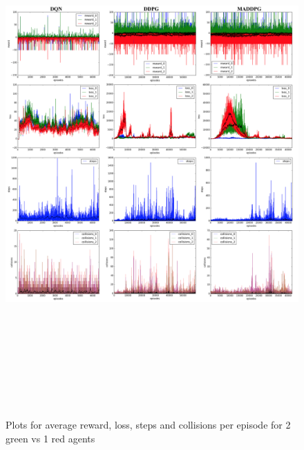 \begin{figure}[htbp]
    \vspace*{-3.5cm}
    \hspace*{-3.5cm}
    \includegraphics[width=21cm, height=20cm]{1vs2}
	\caption{Plots for average reward, loss, steps and collisions per episode for 2 green vs 1 red agents}\label{Figure 3}
\end{figure}

